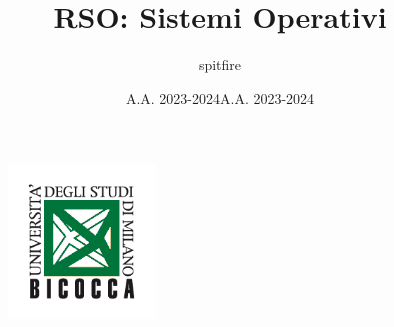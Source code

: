 \documentclass[12pt]{article}
\title{RSO: Sistemi Operativi}
\author{spitfire}
\date{A.A. 2023-2024}
\begin{document}
\begin{figure}
    \centering
    \includegraphics[width=0.35\textwidth]{Images/Logo scienze bicocca.png}
\end{figure}

\vspace{10cm}
\date{A.A. 2023-2024}


\maketitle

\newpage

\tableofcontents
\newpage
\end{document}
